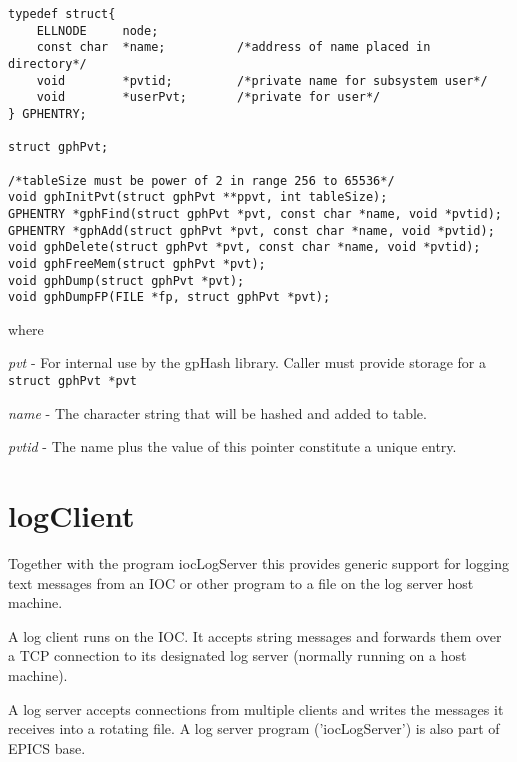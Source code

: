 \begin{verbatim}
typedef struct{
    ELLNODE     node;
    const char  *name;          /*address of name placed in directory*/
    void        *pvtid;         /*private name for subsystem user*/
    void        *userPvt;       /*private for user*/
} GPHENTRY;

struct gphPvt;

/*tableSize must be power of 2 in range 256 to 65536*/
void gphInitPvt(struct gphPvt **ppvt, int tableSize);
GPHENTRY *gphFind(struct gphPvt *pvt, const char *name, void *pvtid);
GPHENTRY *gphAdd(struct gphPvt *pvt, const char *name, void *pvtid);
void gphDelete(struct gphPvt *pvt, const char *name, void *pvtid);
void gphFreeMem(struct gphPvt *pvt);
void gphDump(struct gphPvt *pvt);
void gphDumpFP(FILE *fp, struct gphPvt *pvt);
\end{verbatim}

where

\begin{description}
\item \emph{pvt} - For internal use by the gpHash library. Caller must provide storage for a \verb|struct gphPvt *pvt|

\item \emph{name} - The character string that will be hashed and added to table.

\item \emph{pvtid} - The name plus the value of this pointer constitute a unique entry.

\end{description}

\section{logClient}

Together with the program iocLogServer this provides generic support for logging text messages from an IOC or other 
program to a file on the log server host machine.

A log client runs on the IOC. It accepts string messages and forwards them over a TCP connection to its designated log 
server (normally running on a host machine).

A log server accepts connections from multiple clients and writes the messages it receives into a rotating file. A log server 
program ('iocLogServer') is also part of EPICS base.

